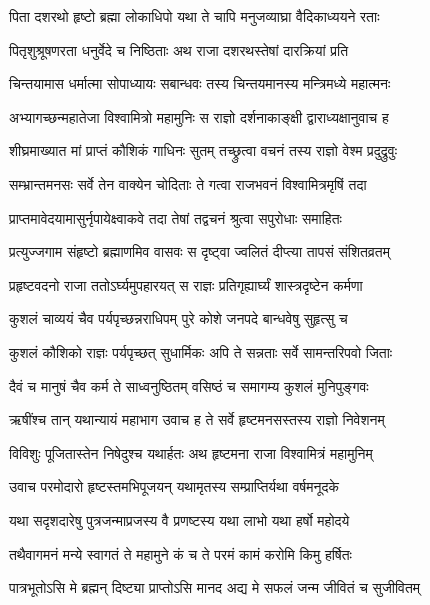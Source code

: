 \twolineshloka
{पिता दशरथो हृष्टो ब्रह्मा लोकाधिपो यथा}
{ते चापि मनुजव्याघ्रा वैदिकाध्ययने रताः} %

\twolineshloka
{पितृशुश्रूषणरता धनुर्वेदे च निष्ठिताः}
{अथ राजा दशरथस्तेषां दारक्रियां प्रति} %

\twolineshloka
{चिन्तयामास धर्मात्मा सोपाध्यायः सबान्धवः}
{तस्य चिन्तयमानस्य मन्त्रिमध्ये महात्मनः} %

\twolineshloka
{अभ्यागच्छन्महातेजा विश्वामित्रो महामुनिः}
{स राज्ञो दर्शनाकाङ्क्षी द्वाराध्यक्षानुवाच ह} %

\twolineshloka
{शीघ्रमाख्यात मां प्राप्तं कौशिकं गाधिनः सुतम्}
{तच्छ्रुत्वा वचनं तस्य राज्ञो वेश्म प्रदुद्रुवुः} %

\twolineshloka
{सम्भ्रान्तमनसः सर्वे तेन वाक्येन चोदिताः}
{ते गत्वा राजभवनं विश्वामित्रमृषिं तदा} %

\twolineshloka
{प्राप्तमावेदयामासुर्नृपायेक्ष्वाकवे तदा}
{तेषां तद्वचनं श्रुत्वा सपुरोधाः समाहितः} %

\twolineshloka
{प्रत्युज्जगाम संहृष्टो ब्रह्माणमिव वासवः}
{स दृष्ट्वा ज्वलितं दीप्त्या तापसं संशितव्रतम्} %

\twolineshloka
{प्रहृष्टवदनो राजा ततोऽर्घ्यमुपहारयत्}
{स राज्ञः प्रतिगृह्यार्घ्यं शास्त्रदृष्टेन कर्मणा} %

\twolineshloka
{कुशलं चाव्ययं चैव पर्यपृच्छन्नराधिपम्}
{पुरे कोशे जनपदे बान्धवेषु सुहृत्सु च} %

\twolineshloka
{कुशलं कौशिको राज्ञः पर्यपृच्छत् सुधार्मिकः}
{अपि ते सन्नताः सर्वे सामन्तरिपवो जिताः} %

\twolineshloka
{दैवं च मानुषं चैव कर्म ते साध्वनुष्ठितम्}
{वसिष्ठं च समागम्य कुशलं मुनिपुङ्गवः} %

\twolineshloka
{ऋषींश्च तान् यथान्यायं महाभाग उवाच ह}
{ते सर्वे हृष्टमनसस्तस्य राज्ञो निवेशनम्} %

\twolineshloka
{विविशुः पूजितास्तेन निषेदुश्च यथार्हतः}
{अथ हृष्टमना राजा विश्वामित्रं महामुनिम्} %

\twolineshloka
{उवाच परमोदारो हृष्टस्तमभिपूजयन्}
{यथामृतस्य सम्प्राप्तिर्यथा वर्षमनूदके} %

\twolineshloka
{यथा सदृशदारेषु पुत्रजन्माप्रजस्य वै}
{प्रणष्टस्य यथा लाभो यथा हर्षो महोदये} %

\twolineshloka
{तथैवागमनं मन्ये स्वागतं ते महामुने}
{कं च ते परमं कामं करोमि किमु हर्षितः} %

\twolineshloka
{पात्रभूतोऽसि मे ब्रह्मन् दिष्ट्या प्राप्तोऽसि मानद}
{अद्य मे सफलं जन्म जीवितं च सुजीवितम्} %

